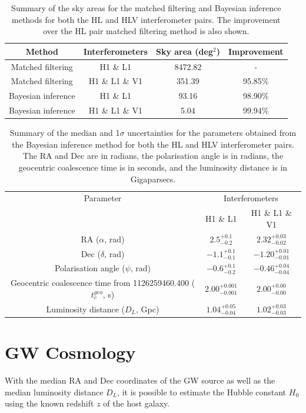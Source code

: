 \documentclass[11pt,a4paper]{article}
\begin{document}
\begin{table}[h]
    \centering
    \begin{tabular}{c|c|c|c}
    Method & Interferometers & Sky area (deg$^2$) & Improvement\\
    \hline
    Matched filtering & H1 \& L1 & 8472.82 & - \\
    Matched filtering & H1 \& L1 \& V1 & 351.39 & 95.85\% \\
    Bayesian inference & H1 \& L1  & 93.16 & 98.90\% \\
    Bayesian inference & H1 \& L1 \& V1 & 5.04 & 99.94\% \\
    \end{tabular}
    \caption{Summary of the sky areas for the matched filtering and Bayesian inference methods for both the HL and HLV interferometer pairs. The improvement over the HL pair matched filtering method is also shown.}
    \label{tab:areas}
\end{table}

\begin{table}[h]
    \centering
    \begin{tabular}{c|c|c}
    Parameter & \multicolumn{2}{c}{Interferometers} \\
    & H1 \& L1 & H1 \& L1 \& V1 \\
    \hline
    RA ($\alpha$, rad) & $2.5^{+0.1}_{-0.2}$ & $2.32^{+0.03}_{-0.02}$ \\
    Dec ($\delta$, rad) & $-1.1^{+0.1}_{-0.1}$ & $-1.20^{+0.01}_{-0.01}$ \\
    Polarisation angle ($\psi$, rad) & $-0.6^{+0.1}_{-0.2}$ & $-0.46^{+0.04}_{-0.04}$ \\
    Geocentric coalescence time from 1126259460.400 ($t_c^{geo}$, s) & $2.00^{+0.001}_{-0.001}$ & $2.00^{+0.00}_{-0.00}$ \\
    Luminosity distance ($D_L$, Gpc) & $1.04^{+0.05}_{-0.04}$ & $1.02^{+0.03}_{-0.03}$ \\
    \end{tabular}
    \caption{Summary of the median and 1$\sigma$ uncertainties for the parameters obtained from the Bayesian inference method for both the HL and HLV interferometer pairs. The RA and Dec are in radians, the polarisation angle is in radians, the geocentric coalescence time is in seconds, and the luminosity distance is in Gigaparsecs.}
    \label{tab:params}
\end{table}
\clearpage
\section{GW Cosmology}
\label{sec:cosmology}
With the median RA and Dec coordinates of the GW source as well as the median luminosity distance $D_L$, it is possible to estimate the Hubble constant $H_0$ using the known redshift $z$ of the host galaxy. 
\end{document}
